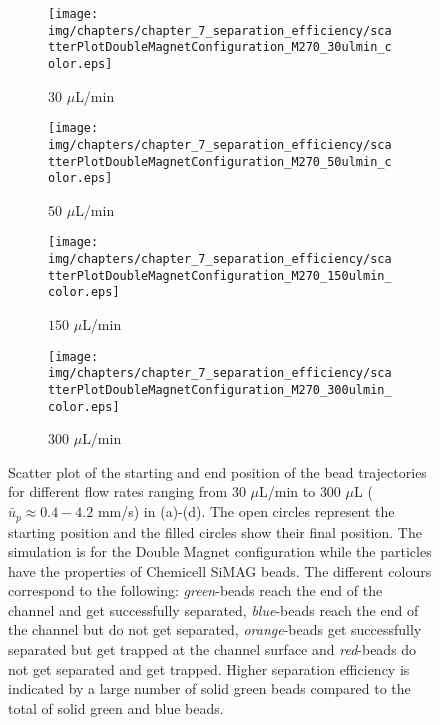 \begin{figure}[htb!]
        \centering
        \begin{subfigure}[b]{0.45\textwidth}
                \texttt{[image: img/chapters/chapter\_7\_separation\_efficiency/scatterPlotDoubleMagnetConfiguration\_M270\_30ulmin\_color.eps]}
                \caption{$30$ $\mu$L/min}  
        \end{subfigure}
        \hfill
        \begin{subfigure}[b]{0.45\textwidth}
                \texttt{[image: img/chapters/chapter\_7\_separation\_efficiency/scatterPlotDoubleMagnetConfiguration\_M270\_50ulmin\_color.eps]}
                \caption{$50$ $\mu$L/min}                
        \end{subfigure}
        \hfill
        \begin{subfigure}[b]{0.45\textwidth}
                \texttt{[image: img/chapters/chapter\_7\_separation\_efficiency/scatterPlotDoubleMagnetConfiguration\_M270\_150ulmin\_color.eps]}
                \caption{$150$ $\mu$L/min}
        \end{subfigure}
        \hfill
        \begin{subfigure}[b]{0.45\textwidth}
                \texttt{[image: img/chapters/chapter\_7\_separation\_efficiency/scatterPlotDoubleMagnetConfiguration\_M270\_300ulmin\_color.eps]}
                \caption{$300$ $\mu$L/min}
        \end{subfigure}
        \caption[Scatter plot of starting and end position of magnetic particles for different flow rates using the Double Magnet configuration]{Scatter plot of the starting and end position of the bead trajectories for different flow rates ranging from $30$ $\mu$L/min to $300$ $\mu$L ($\bar{u}_{p}\approx 0.4-4.2$ mm/s) in (a)-(d). The open circles represent the starting position and the filled circles show their final position. The simulation is for the Double Magnet configuration while the particles have the properties of Chemicell SiMAG beads. The different colours correspond to the following: \textit{green}-beads reach the end of the channel and get successfully separated, \textit{blue}-beads reach the end of the channel but do not get separated, \textit{orange}-beads get successfully separated but get trapped at the channel surface and \textit{red}-beads do not get separated and get trapped. Higher separation efficiency is indicated by a large number of solid green beads compared to the total of solid green and blue beads.}
        \label{fig:scatterPlotDoubleMagnetConfiguration}
\end{figure}

